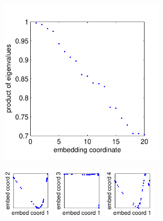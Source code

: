 \documentclass[10pt]{article}
\begin{document}
\centering

\noindent
\includegraphics[width=8cm]{zebrafish_eval_spectrum}

\noindent
\includegraphics[width=2.5cm]{zebrafish_evec_corr1}
\includegraphics[width=2.5cm]{zebrafish_evec_corr2}
\includegraphics[width=2.5cm]{zebrafish_evec_corr3}
\end{document}
